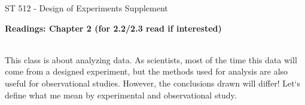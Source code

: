 \documentclass{report}
\begin{document}
\setlength{\topmargin}{0pt}
\setlength{\oddsidemargin}{0pt}

\newpage
{}
\Huge ST 512 - Design of Experiments Supplement\large
\begin{center}\large\textbf{Readings: Chapter 2 (for 2.2/2.3 read if interested)}\\
\normalsize \end{center}
\large ~\hrulefill
~\\
\normalsize This class is about analyzing data.  As scientists, most of the time this data will come from a designed experiment, but the methods used for analysis are also useful for observational studies.  However, the conclusions drawn will differ!  Let`s define what me mean by experimental and observational study.\\~\\
\end{document}
